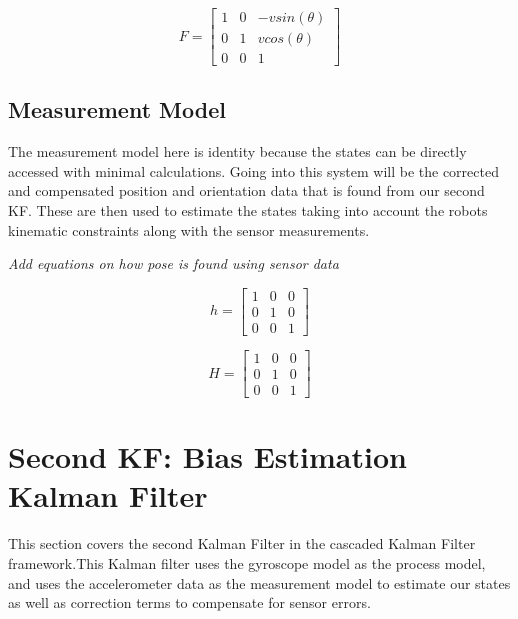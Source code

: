\begin{equation}
  F = \begin{bmatrix}
    1 & 0 & -vsin(\theta) \\
    0 & 1 &  vcos(\theta) \\
    0 & 0 &       1
  \end{bmatrix}
\end{equation}



\subsection{Measurement Model}

The measurement model here is identity because the states can be directly 
accessed with minimal calculations. Going into this system will be the corrected 
and compensated position and orientation data that is found from our second KF.
These are then used to estimate the states taking into account the robots kinematic
constraints along with the sensor measurements.  

\emph{Add equations on how pose is found using sensor data}

\begin{equation}
  h = \begin{bmatrix}
    1 & 0 &  0 \\
    0 & 1 &  0 \\
    0 & 0 &  1
  \end{bmatrix}
\end{equation}

\begin{equation}
  H = \begin{bmatrix}
    1 & 0 & 0 \\
    0 & 1 & 0 \\
    0 & 0 & 1
  \end{bmatrix}
\end{equation}


\section{Second KF: Bias Estimation Kalman Filter}

This section covers the second Kalman Filter in the cascaded Kalman Filter 
framework.This Kalman filter uses the gyroscope model as the process model, 
and uses the accelerometer data as the measurement model to estimate our 
states as well as correction terms to compensate for sensor errors.

